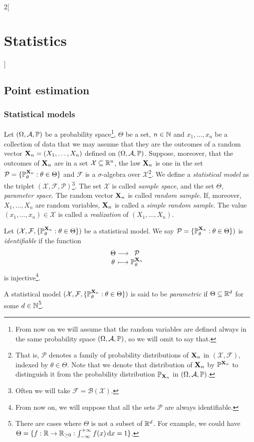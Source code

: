 \documentclass[../../../main_math.tex]{subfiles}
\begin{document}
\renewcommand{\col}{\sta}
\begin{multicols}{2}[\section{Statistics}]
  \subsection{Point estimation}
  \subsubsection{Statistical models}
  \begin{definition}
    Let $(\Omega,\mathcal{A},\mathbb{P})$ be a probability space\footnote{From now on we will assume that the random variables are defined always in the same probability space $(\Omega,\mathcal{A},\mathbb{P})$, so we will omit to say that.}, $\Theta$ be a set, $n\in\mathbb{N}$ and $x_1,\ldots,x_n$ be a collection of data that we may assume that they are the outcomes of a random vector $\boldsymbol{\mathrm{X}}_n=(X_1,\ldots,X_n)$ defined on $(\Omega,\mathcal{A},\mathbb{P})$. Suppose, moreover, that the outcomes of $\boldsymbol{\mathrm{X}}_n$ are in a set $\mathcal{X}\subseteq\mathbb{R}^n$, the law $\boldsymbol{\mathrm{X}}_n$ is one in the set $\mathcal{P}=\{\mathbb{P}_\theta^{\boldsymbol{\mathrm{X}}_n}:\theta\in\Theta\}$ and $\mathcal{F}$ is a $\sigma$-algebra over $\mathcal{X}$\footnote{That is, $\mathcal{P}$ denotes a family of probability distributions of $\boldsymbol{\mathrm{X}}_n$ in $(\mathcal{X},\mathcal{F})$, indexed by $\theta\in\Theta$. Note that we denote that distribution of $\boldsymbol{\mathrm{X}}_n$ by $\mathbb{P}^{\boldsymbol{\mathrm{X}}_n}$ to distinguish it from the probability distribution $\mathbb{P}_{\boldsymbol{\mathrm{X}}_n}$ in $(\Omega,\mathcal{A},\mathbb{P})$.}. We define a \emph{statistical model} as the triplet $(\mathcal{X},\mathcal{F},\mathcal{P})$\footnote{Often we will take $\mathcal{F}=\mathcal{B}(\mathcal{X})$.}. The set $\mathcal{X}$ is called \emph{sample space}, and the set $\Theta$, \emph{parameter space}. The random vector $\boldsymbol{\mathrm{X}}_n$ is called \emph{random sample}. If, moreover, $X_1,\ldots,X_n$ are \iid random variables, $\boldsymbol{\mathrm{X}}_n$ is called a \emph{simple random sample}. The value $(x_1,\ldots,x_n)\in\mathcal{X}$ is called a \emph{realization} of $(X_1,\ldots,X_n)$.
  \end{definition}
  \begin{definition}
    Let $(\mathcal{X},\mathcal{F},\{\mathbb{P}_\theta^{\boldsymbol{\mathrm{X}}_n}:\theta\in\Theta\})$ be a statistical model. We say $\mathcal{P}=\{\mathbb{P}_\theta^{\boldsymbol{\mathrm{X}}_n}:\theta\in\Theta\})$ is \emph{identifiable} if the function $$\function{}{\Theta}{\mathcal{P}}{\theta}{\Prob_\theta^{\vf{X}_n}}$$ is injective\footnote{From now on, we will suppose that all the sets $\mathcal{P}$ are always identifiable.}.
  \end{definition}
  \begin{definition}
    A statistical model $(\mathcal{X},\mathcal{F},\{\mathbb{P}_\theta^{\boldsymbol{\mathrm{X}}_n}:\theta\in\Theta\})$ is said to be \emph{parametric} if $\Theta\subseteq \mathbb{R}^d$ for some $d\in\mathbb{N}$\footnote{There are cases where $\Theta$ is not a subset of $\mathbb{R}^d$. For example, we could have $\Theta=\{f:\mathbb{R}\rightarrow\mathbb{R}_{\geq 0} : \int_{-\infty}^{+\infty}f(x)\dd{x}=1\}$.}.
  \end{definition}

\end{multicols}
\end{document}
